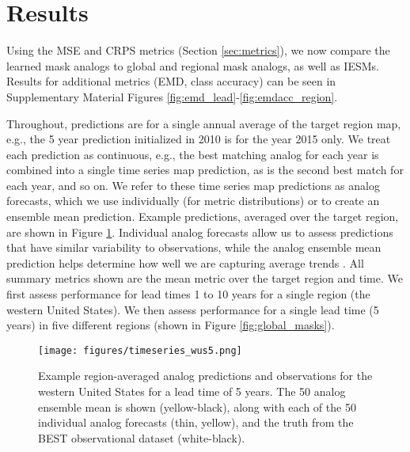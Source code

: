 \section{Results}\label{sec:results}

Using the MSE and CRPS metrics (Section \ref{sec:metrics}), we now compare the learned mask analogs to global and regional mask analogs, as well as IESMs.
Results for additional metrics (EMD, class accuracy) can be seen in Supplementary Material Figures \ref{fig:emd_lead}-\ref{fig:emdacc_region}.

Throughout, predictions are for a single annual average of the target region map, e.g., the 5 year prediction initialized in 2010 is for the year 2015 only.
We treat each prediction as continuous, e.g., the best matching analog for each year is combined into a single time series map prediction, as is the second best match for each year, and so on.
We refer to these time series map predictions as analog forecasts, which we use individually (for metric distributions) or to create an ensemble mean prediction.
Example predictions, averaged over the target region, are shown in Figure \ref{fig:wus_timeseries}.
Individual analog forecasts allow us to assess predictions that have similar variability to observations, while the analog ensemble mean prediction helps determine how well we are capturing average trends \cite{Kim2025}.
All summary metrics shown are the mean metric over the target region and time.
We first assess performance for lead times 1 to 10 years for a single region (the western United States).
We then assess performance for a single lead time (5 years) in five different regions (shown in Figure \ref{fig:global_masks}).

\begin{figure}[h!]
    \noindent\texttt{[image: figures/timeseries\_wus5.png]}
    \caption{Example region-averaged analog predictions and observations for the western United States for a lead time of 5 years.
    The 50 analog ensemble mean is shown (yellow-black), along with each of the 50 individual analog forecasts (thin, yellow), and the truth from the BEST observational dataset (white-black).
    }
    \label{fig:wus_timeseries}
\end{figure}

